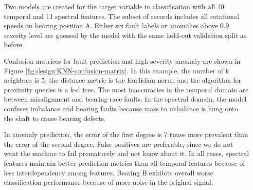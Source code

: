 Two models are created for the target variable in classification with all 10 temporal and 11 spectral features. The subset of records includes all rotational speeds on bearing position A. Either six fault labels or anomalies above 0.9 severity level are guessed by the model with the same hold-out validation split as before. 

Confusion matrices for fault prediction and high severity anomaly are shown in Figure \ref{fig:design:KNN-confusion-matrix}. In this example, the number of k neighbors is 5, the distance metric is the Euclidian norm, and the algorithm for proximity queries is a k-d tree. The most inaccuracies in the temporal domain are between misalignment and bearing race faults. In the spectral domain, the model confuses imbalance and bearing faults because mass to unbalance is hung onto the shaft to cause bearing defects. 

In anomaly prediction, the error of the first degree is 7 times more prevalent than the error of the second degree. False positives are preferable, since we do not want the machine to fail prematurely and not know about it. In all cases, spectral features maintain better prediction metrics than all temporal features because of less interdependency among features. Bearing B exhibits overall worse classification performance because of more noise in the original signal.

